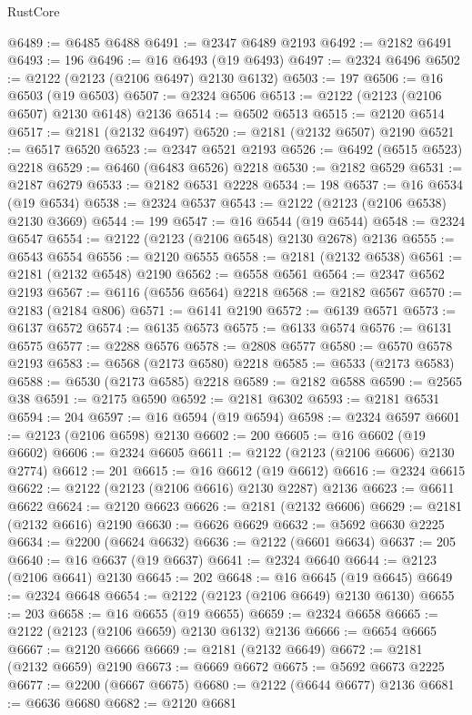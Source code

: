 \begin{lexlean}{RustCore}
\begin{coremodule}
@6489 := @6485 @6488
@6491 := @2347 @6489 @2193
@6492 := @2182 @6491
@6493 := 196
@6496 := @16 @6493 (@19 @6493)
@6497 := @2324 @6496
@6502 := @2122 (@2123 (@2106 @6497) @2130 @6132)
@6503 := 197
@6506 := @16 @6503 (@19 @6503)
@6507 := @2324 @6506
@6513 := @2122 (@2123 (@2106 @6507) @2130 @6148) @2136
@6514 := @6502 @6513
@6515 := @2120 @6514
@6517 := @2181 (@2132 @6497)
@6520 := @2181 (@2132 @6507) @2190
@6521 := @6517 @6520
@6523 := @2347 @6521 @2193
@6526 := @6492 (@6515 @6523) @2218
@6529 := @6460 (@6483 @6526) @2218
@6530 := @2182 @6529
@6531 := @2187 @6279
@6533 := @2182 @6531 @2228
@6534 := 198
@6537 := @16 @6534 (@19 @6534)
@6538 := @2324 @6537
@6543 := @2122 (@2123 (@2106 @6538) @2130 @3669)
@6544 := 199
@6547 := @16 @6544 (@19 @6544)
@6548 := @2324 @6547
@6554 := @2122 (@2123 (@2106 @6548) @2130 @2678) @2136
@6555 := @6543 @6554
@6556 := @2120 @6555
@6558 := @2181 (@2132 @6538)
@6561 := @2181 (@2132 @6548) @2190
@6562 := @6558 @6561
@6564 := @2347 @6562 @2193
@6567 := @6116 (@6556 @6564) @2218
@6568 := @2182 @6567
@6570 := @2183 (@2184 @806)
@6571 := @6141 @2190
@6572 := @6139 @6571
@6573 := @6137 @6572
@6574 := @6135 @6573
@6575 := @6133 @6574
@6576 := @6131 @6575
@6577 := @2288 @6576
@6578 := @2808 @6577
@6580 := @6570 @6578 @2193
@6583 := @6568 (@2173 @6580) @2218
@6585 := @6533 (@2173 @6583)
@6588 := @6530 (@2173 @6585) @2218
@6589 := @2182 @6588
@6590 := @2565 @38
@6591 := @2175 @6590
@6592 := @2181 @6302
@6593 := @2181 @6531
@6594 := 204
@6597 := @16 @6594 (@19 @6594)
@6598 := @2324 @6597
@6601 := @2123 (@2106 @6598) @2130
@6602 := 200
@6605 := @16 @6602 (@19 @6602)
@6606 := @2324 @6605
@6611 := @2122 (@2123 (@2106 @6606) @2130 @2774)
@6612 := 201
@6615 := @16 @6612 (@19 @6612)
@6616 := @2324 @6615
@6622 := @2122 (@2123 (@2106 @6616) @2130 @2287) @2136
@6623 := @6611 @6622
@6624 := @2120 @6623
@6626 := @2181 (@2132 @6606)
@6629 := @2181 (@2132 @6616) @2190
@6630 := @6626 @6629
@6632 := @5692 @6630 @2225
@6634 := @2200 (@6624 @6632)
@6636 := @2122 (@6601 @6634)
@6637 := 205
@6640 := @16 @6637 (@19 @6637)
@6641 := @2324 @6640
@6644 := @2123 (@2106 @6641) @2130
@6645 := 202
@6648 := @16 @6645 (@19 @6645)
@6649 := @2324 @6648
@6654 := @2122 (@2123 (@2106 @6649) @2130 @6130)
@6655 := 203
@6658 := @16 @6655 (@19 @6655)
@6659 := @2324 @6658
@6665 := @2122 (@2123 (@2106 @6659) @2130 @6132) @2136
@6666 := @6654 @6665
@6667 := @2120 @6666
@6669 := @2181 (@2132 @6649)
@6672 := @2181 (@2132 @6659) @2190
@6673 := @6669 @6672
@6675 := @5692 @6673 @2225
@6677 := @2200 (@6667 @6675)
@6680 := @2122 (@6644 @6677) @2136
@6681 := @6636 @6680
@6682 := @2120 @6681

\end{coremodule}
\end{lexlean}
